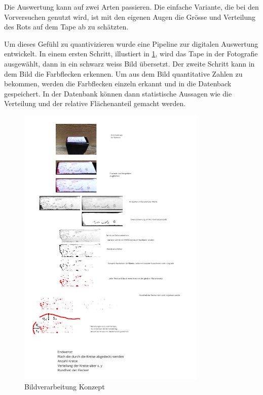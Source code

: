 Die Auswertung kann auf zwei Arten passieren. Die einfache Variante, die bei den Vorversuchen genutzt wird, ist mit den eigenen Augen die Grösse und Verteilung des Rots auf dem Tape ab zu schätzten.

Um dieses Gefühl zu quantivizieren wurde eine Pipeline zur digitalen Auswertung entwickelt. In einem ersten Schritt, illustiert in \ref{fig:Bildverarbeitnugskonzpet}, wird das Tape in der Fotografie ausgewählt, dann in ein schwarz weiss Bild übersetzt. Der zweite Schritt kann in dem Bild die Farbflecken erkennen. Um aus dem Bild quantitative Zahlen zu bekommen, werden die Farbflecken einzeln erkannt und in die Datenback gespeichert. In der Datenbank können dann statistische Aussagen wie die Verteilung und der relative Flächenanteil gemacht werden.

\begin{figure}
    \centering
    \includegraphics[width=0.8\textwidth]{Bilder/Screenshotfrom2024-04-0112-59-42.png}
    \caption{Bildverarbeitung Konzept}
    \label{fig:Bildverarbeitnugskonzpet}
\end{figure}

\newpage
